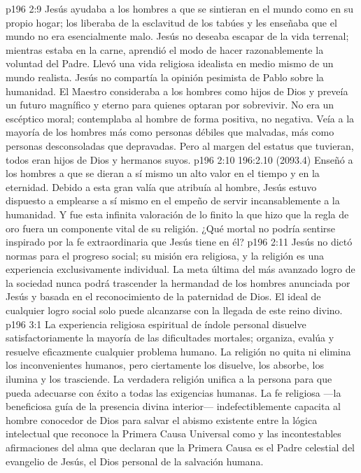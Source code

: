 \vs p196 2:9 Jesús ayudaba a los hombres a que se sintieran en el mundo como en su propio hogar; los liberaba de la esclavitud de los tabúes y les enseñaba que el mundo no era esencialmente malo. Jesús no deseaba escapar de la vida terrenal; mientras estaba en la carne, aprendió el modo de hacer razonablemente la voluntad del Padre. Llevó una vida religiosa idealista en medio mismo de un mundo realista. Jesús no compartía la opinión pesimista de Pablo sobre la humanidad. El Maestro consideraba a los hombres como hijos de Dios y preveía un futuro magnífico y eterno para quienes optaran por sobrevivir. No era un escéptico moral; contemplaba al hombre de forma positiva, no negativa. Veía a la mayoría de los hombres más como personas débiles que malvadas, más como personas desconsoladas que depravadas. Pero al margen del estatus que tuvieran, todos eran hijos de Dios y hermanos suyos.
\vs p196 2:10 196:2.10 (2093.4) Enseñó a los hombres a que se dieran a sí mismo un alto valor en el tiempo y en la eternidad. Debido a esta gran valía que atribuía al hombre, Jesús estuvo dispuesto a emplearse a sí mismo en el empeño de servir incansablemente a la humanidad. Y fue esta infinita valoración de lo finito la que hizo que la regla de oro fuera un componente vital de su religión. ¿Qué mortal no podría sentirse inspirado por la fe extraordinaria que Jesús tiene en él?
\vs p196 2:11 Jesús no dictó normas para el progreso social; su misión era religiosa, y la religión es una experiencia exclusivamente individual. La meta última del más avanzado logro de la sociedad nunca podrá trascender la hermandad de los hombres anunciada por Jesús y basada en el reconocimiento de la paternidad de Dios. El ideal de cualquier logro social solo puede alcanzarse con la llegada de este reino divino.
\vs p196 3:1 La experiencia religiosa espiritual de índole personal disuelve satisfactoriamente la mayoría de las dificultades mortales; organiza, evalúa y resuelve eficazmente cualquier problema humano. La religión no quita ni elimina los inconvenientes humanos, pero ciertamente los disuelve, los absorbe, los ilumina y los trasciende. La verdadera religión unifica a la persona para que pueda adecuarse con éxito a todas las exigencias humanas. La fe religiosa ---la beneficiosa guía de la presencia divina interior--- indefectiblemente capacita al hombre conocedor de Dios para salvar el abismo existente entre la lógica intelectual que reconoce la Primera Causa Universal como  y las incontestables afirmaciones del alma que declaran que la Primera Causa es  el Padre celestial del evangelio de Jesús, el Dios personal de la salvación humana.
